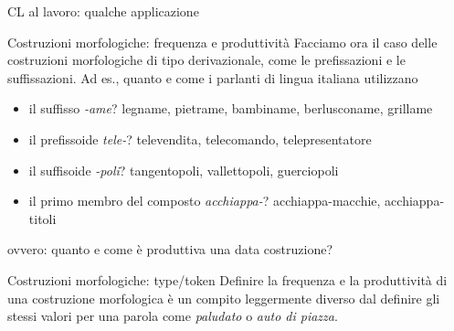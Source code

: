 \documentclass[pdf]{prosper}
\begin{document}
\begin{tsectionandpart}{CL al lavoro: qualche applicazione}


\begin{slide}{Costruzioni morfologiche: frequenza e produttività}
Facciamo ora il caso delle costruzioni morfologiche di tipo derivazionale, come le prefissazioni e le suffissazioni. Ad es., quanto e come i parlanti di lingua italiana utilizzano

	\begin{itemize}
		\item il suffisso {\it -ame}? legname, pietrame, bambiname, berlusconame, grillame 
		\item il prefissoide {\it tele-}? televendita, telecomando, telepresentatore
		\item il suffisoide {\it -poli}? tangentopoli, vallettopoli, guerciopoli
		\item il primo membro del composto {\it acchiappa-}? acchiappa-macchie, acchiappa-titoli
	\end{itemize}


ovvero: quanto e come è produttiva una data costruzione?

\end{slide}

\begin{slide}{Costruzioni morfologiche: type/token}
	Definire la frequenza e la produttività di una costruzione morfologica è un compito leggermente diverso dal definire gli stessi valori per una parola come {\it paludato} o {\it auto di piazza}.


\end{slide}
\end{tsectionandpart}
\end{document}
